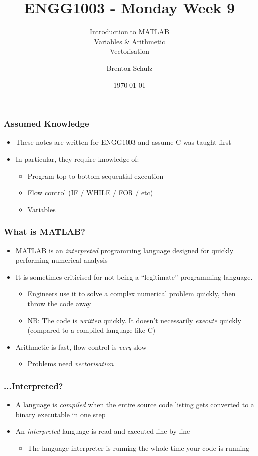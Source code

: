 \documentclass[14pt]{beamer}
\title{ENGG1003 - Monday Week 9}
\subtitle{Introduction to MATLAB\\Variables \& Arithmetic\\Vectorisation}
\author{Brenton Schulz}
\institute{University of Newcastle}
\date{\today}
\begin{document}
\titlepage

\begin{frame}
\frametitle{Assumed Knowledge}
\begin{itemize}
\item These notes are written for ENGG1003 and assume C was taught first
\item In particular, they require knowledge of:
	\begin{itemize}
		\item Program top-to-bottom sequential execution
		\item Flow control (IF / WHILE / FOR / etc)
		\item Variables
	\end{itemize}
\end{itemize}
\end{frame}

\begin{frame}
\frametitle{What is MATLAB?}
\begin{itemize}
\item MATLAB is an \textit{interpreted} programming language designed for quickly performing numerical analysis
\item It is sometimes criticised for not being a ``legitimate'' programming language.
	\begin{itemize}
		\item Engineers use it to solve a complex numerical problem quickly, then throw the code away
		\item NB: The code is \textit{written} quickly. It doesn't necessarily \textit{execute} quickly (compared to a compiled language like C)
	\end{itemize}
\item Arithmetic is fast, flow control is \textit{very} slow
\begin{itemize}
	\item Problems need \textit{vectorisation}
\end{itemize}
\end{itemize}
\end{frame}

\begin{frame}
\frametitle{...Interpreted?}
\begin{itemize}
\item A language is \textit{compiled} when the entire source code listing gets converted to a binary executable in one step
\item An \textit{interpreted} language is read and executed line-by-line
	\begin{itemize}
		\item The language interpreter is running the whole time your code is running
	\end{itemize}

\end{itemize}
\end{frame}
\end{document}
